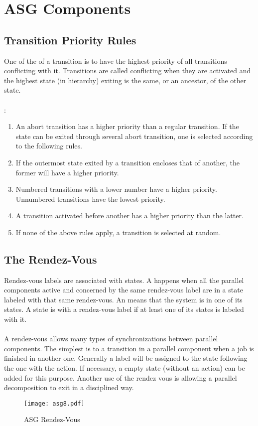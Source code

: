 \documentclass[../main.tex]{subfiles}
\begin{document}
\section{ASG Components}

\subsection{Transition Priority Rules}
One of the  of a transition is to have the highest priority of all transitions conflicting  with it. Transitions are called conflicting when they are activated and the highest state (in hierarchy) exiting is the same, or an ancestor, of the other state.
\\\\
:
\begin{enumerate}
	\item An abort transition has a higher priority than a regular transition. If the state can be exited through several abort transition, one is selected according to the following rules.
	\item If the outermost state exited by a transition encloses that of another, the former will have a higher priority.
	\item Numbered transitions with a lower number have a higher priority. Unnumbered transitions have the lowest priority.
	\item A transition activated before another has a higher priority than the latter.
	\item If none of the above rules apply, a transition is selected at random.
\end{enumerate}

\subsection{The Rendez-Vous}
Rendez-vous labels are associated with states.
A  happens when all the parallel components active and concerned by the same rendez-vous label are in a state labeled with that same rendez-vous.
An  means that the system is in one of its states.
A state is  with a rendez-vous label if at least one of its states is labeled with it.
\\\\
A rendez-vous allows many types of synchronizations between parallel components.
The simplest is to  a transition in a parallel component when a job is finished in another one.
Generally a label will be assigned to the state following the one with the action.
If necessary, a empty state (without an action) can be added for this purpose.
Another use of the rendez vous is allowing a parallel decomposition to exit in a disciplined way.
\begin{figure}[H]
    \centering
    \texttt{[image: asg8.pdf]}
    \caption{ASG Rendez-Vous}
    \label{asg8}
\end{figure}
\end{document}
